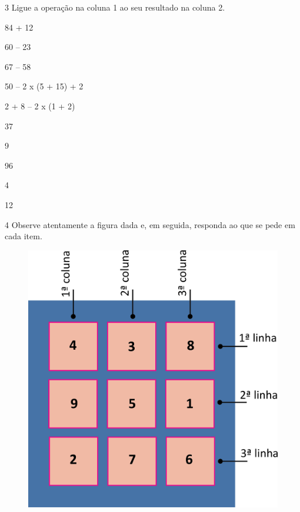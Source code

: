\pagebreak

\num{3} Ligue a operação na coluna 1 ao seu resultado na coluna 2.

\begin{multicols}{2}
84 + 12

60 -- 23

67 -- 58

50 -- 2 x (5 + 15) + 2

2 + 8 -- 2 x (1 + 2)

37

9

96

4

12
\end{multicols}

\num{4} Observe atentamente a figura dada e, em seguida, responda ao que se pede em cada item.


\begin{figure}[htpb!]
\centering
\includegraphics[width=.5\textwidth]{./media/image14.png}
\end{figure}

